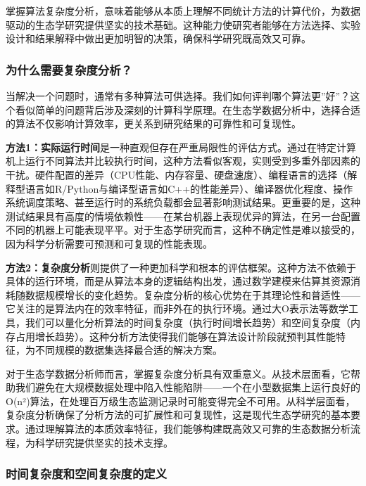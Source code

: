 \documentclass[
  twoside]{book}
\begin{document}
掌握算法复杂度分析，意味着能够从本质上理解不同统计方法的计算代价，为数据驱动的生态学研究提供坚实的技术基础。这种能力使研究者能够在方法选择、实验设计和结果解释中做出更加明智的决策，确保科学研究既高效又可靠。

\hypertarget{ux4e3aux4ec0ux4e48ux9700ux8981ux590dux6742ux5ea6ux5206ux6790}{%
\subsubsection{为什么需要复杂度分析？}\label{ux4e3aux4ec0ux4e48ux9700ux8981ux590dux6742ux5ea6ux5206ux6790}}

当解决一个问题时，通常有多种算法可供选择。我们如何评判哪个算法更''好''？这个看似简单的问题背后涉及深刻的计算科学原理。在生态学数据分析中，选择合适的算法不仅影响计算效率，更关系到研究结果的可靠性和可复现性。

\textbf{方法1：实际运行时间}是一种直观但存在严重局限性的评估方式。通过在特定计算机上运行不同算法并比较执行时间，这种方法看似客观，实则受到多重外部因素的干扰。硬件配置的差异（CPU性能、内存容量、硬盘速度）、编程语言的选择（解释型语言如R/Python与编译型语言如C++的性能差异）、编译器优化程度、操作系统调度策略、甚至运行时的系统负载都会显著影响测试结果。更重要的是，这种测试结果具有高度的情境依赖性------在某台机器上表现优异的算法，在另一台配置不同的机器上可能表现平平。对于生态学研究而言，这种不确定性是难以接受的，因为科学分析需要可预测和可复现的性能表现。

\textbf{方法2：复杂度分析}则提供了一种更加科学和根本的评估框架。这种方法不依赖于具体的运行环境，而是从算法本身的逻辑结构出发，通过数学建模来估算其资源消耗随数据规模增长的变化趋势。复杂度分析的核心优势在于其理论性和普适性------它关注的是算法内在的效率特征，而非外在的执行环境。通过大O表示法等数学工具，我们可以量化分析算法的时间复杂度（执行时间增长趋势）和空间复杂度（内存占用增长趋势）。这种分析方法使得我们能够在算法设计阶段就预判其性能特征，为不同规模的数据集选择最合适的解决方案。

对于生态学数据分析师而言，掌握复杂度分析具有双重意义。从技术层面看，它帮助我们避免在大规模数据处理中陷入性能陷阱------一个在小型数据集上运行良好的O(n²)算法，在处理百万级生态监测记录时可能变得完全不可用。从科学层面看，复杂度分析确保了分析方法的可扩展性和可复现性，这是现代生态学研究的基本要求。通过理解算法的本质效率特征，我们能够构建既高效又可靠的生态数据分析流程，为科学研究提供坚实的技术支撑。

\hypertarget{ux65f6ux95f4ux590dux6742ux5ea6ux548cux7a7aux95f4ux590dux6742ux5ea6ux7684ux5b9aux4e49}{%
\subsubsection{时间复杂度和空间复杂度的定义}\label{ux65f6ux95f4ux590dux6742ux5ea6ux548cux7a7aux95f4ux590dux6742ux5ea6ux7684ux5b9aux4e49}}
\end{document}
